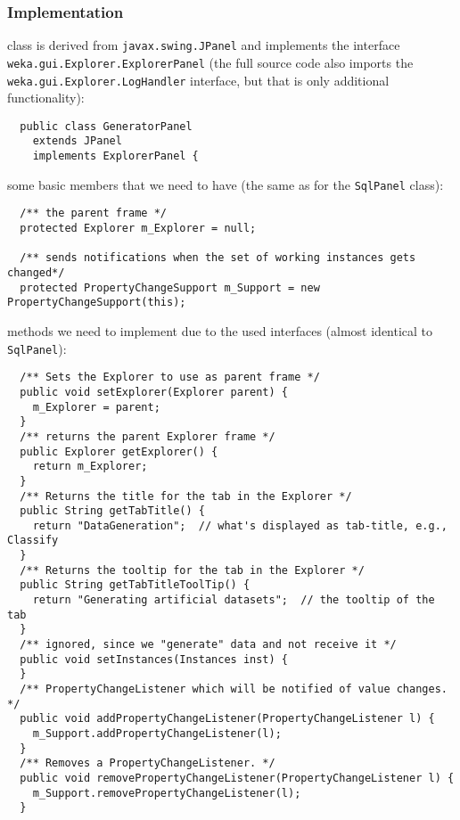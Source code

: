 \subsubsection*{Implementation}
\begin{tight_itemize}
  \item class is derived from \texttt{javax.swing.JPanel} and implements the
interface \texttt{weka.gui.Explorer.ExplorerPanel} (the full source code also
imports the \texttt{weka.gui.Explorer.LogHandler} interface, but that is only
additional functionality):
  \begin{verbatim}
  public class GeneratorPanel
    extends JPanel
    implements ExplorerPanel {
  \end{verbatim}

  \item some basic members that we need to have (the same as for the
\texttt{SqlPanel} class):
  \begin{verbatim}
  /** the parent frame */
  protected Explorer m_Explorer = null;

  /** sends notifications when the set of working instances gets changed*/
  protected PropertyChangeSupport m_Support = new PropertyChangeSupport(this);
  \end{verbatim}

  \item methods we need to implement due to the used interfaces (almost
identical to \texttt{SqlPanel}):
  \begin{verbatim}
  /** Sets the Explorer to use as parent frame */
  public void setExplorer(Explorer parent) {
    m_Explorer = parent;
  }
  /** returns the parent Explorer frame */
  public Explorer getExplorer() {
    return m_Explorer;
  }
  /** Returns the title for the tab in the Explorer */
  public String getTabTitle() {
    return "DataGeneration";  // what's displayed as tab-title, e.g., Classify
  }
  /** Returns the tooltip for the tab in the Explorer */
  public String getTabTitleToolTip() {
    return "Generating artificial datasets";  // the tooltip of the tab
  }
  /** ignored, since we "generate" data and not receive it */
  public void setInstances(Instances inst) {
  }
  /** PropertyChangeListener which will be notified of value changes. */
  public void addPropertyChangeListener(PropertyChangeListener l) {
    m_Support.addPropertyChangeListener(l);
  }
  /** Removes a PropertyChangeListener. */
  public void removePropertyChangeListener(PropertyChangeListener l) {
    m_Support.removePropertyChangeListener(l);
  }
  \end{verbatim}


\end{tight_itemize}
